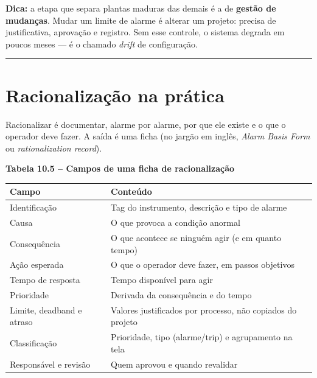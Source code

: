 \begin{caixadica}

\textbf{Dica:} a etapa que separa plantas maduras das demais é a de \textbf{gestão de mudanças}. Mudar um limite de alarme é alterar um projeto: precisa de justificativa, aprovação e registro. Sem esse controle, o sistema degrada em poucos meses --- é o chamado \emph{drift} de configuração.

\end{caixadica}

\begin{center}\rule{0.5\linewidth}{0.5pt}\end{center}

\section{Racionalização na prática}\label{racionalizauxe7uxe3o-na-pruxe1tica}

Racionalizar é documentar, alarme por alarme, por que ele existe e o que o operador deve fazer. A saída é uma ficha (no jargão em inglês, \emph{Alarm Basis Form} ou \emph{rationalization record}).

\textbf{Tabela 10.5 -- Campos de uma ficha de racionalização}

\begin{longtable}[]{@{}
  >{\raggedright\arraybackslash}p{}
  >{\raggedright\arraybackslash}p{}@{}}
\toprule\noalign{}
\begin{minipage}[b]{\linewidth}\raggedright
Campo
\end{minipage} & \begin{minipage}[b]{\linewidth}\raggedright
Conteúdo
\end{minipage} \\
\midrule\noalign{}
\endhead
\bottomrule\noalign{}
\endlastfoot
Identificação & Tag do instrumento, descrição e tipo de alarme \\
Causa & O que provoca a condição anormal \\
Consequência & O que acontece se ninguém agir (e em quanto tempo) \\
Ação esperada & O que o operador deve fazer, em passos objetivos \\
Tempo de resposta & Tempo disponível para agir \\
Prioridade & Derivada da consequência e do tempo \\
Limite, deadband e atraso & Valores justificados por processo, não copiados do projeto \\
Classificação & Prioridade, tipo (alarme/trip) e agrupamento na tela \\
Responsável e revisão & Quem aprovou e quando revalidar \\
\end{longtable}

